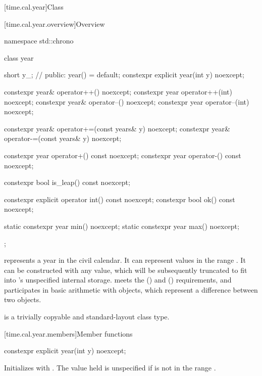 [time.cal.year]{Class }

[time.cal.year.overview]{Overview}

\begin{codeblock}
namespace std::chrono {
  class year {
    short y_;                   // \expos
  public:
    year() = default;
    constexpr explicit year(int y) noexcept;

    constexpr year& operator++()    noexcept;
    constexpr year  operator++(int) noexcept;
    constexpr year& operator--()    noexcept;
    constexpr year  operator--(int) noexcept;

    constexpr year& operator+=(const years& y) noexcept;
    constexpr year& operator-=(const years& y) noexcept;

    constexpr year operator+() const noexcept;
    constexpr year operator-() const noexcept;

    constexpr bool is_leap() const noexcept;

    constexpr explicit operator int() const noexcept;
    constexpr bool ok() const noexcept;

    static constexpr year min() noexcept;
    static constexpr year max() noexcept;
  };
}
\end{codeblock}

\pnum
{} represents a year in the civil calendar.
It can represent values in the range .
It can be constructed with any  value,
which will be subsequently truncated to fit into 's unspecified internal storage.
 meets the  ()
and  () requirements,
and participates in basic arithmetic with  objects,
which represent a difference between two  objects.

\pnum
{} is a trivially copyable and standard-layout class type.

[time.cal.year.members]{Member functions}

%
\begin{itemdecl}
constexpr explicit year(int y) noexcept;
\end{itemdecl}

\begin{itemdescr}
\pnum
\effects
Initializes  with .
The value held is unspecified if  is not in the range .
\end{itemdescr}

